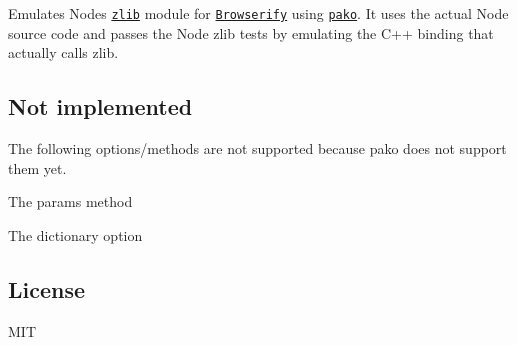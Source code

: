 Emulates Node\textquotesingle{}s \href{http://nodejs.org/api/zlib.html}{\tt zlib} module for \href{http://browserify.org}{\tt Browserify} using \href{https://github.com/nodeca/pako}{\tt pako}. It uses the actual Node source code and passes the Node zlib tests by emulating the C++ binding that actually calls zlib.

\href{https://ci.testling.com/devongovett/browserify-zlib}{\tt }

\href{https://travis-ci.org/devongovett/browserify-zlib}{\tt }

\subsection*{Not implemented}

The following options/methods are not supported because pako does not support them yet.


\begin{DoxyItemize}
\item The {\ttfamily params} method
\item The {\ttfamily dictionary} option
\end{DoxyItemize}

\subsection*{License}

M\+IT 